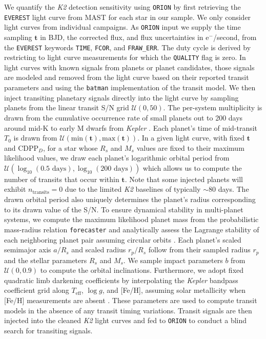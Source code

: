 \documentclass[twocolumn]{emulateapj}
\newcommand{\kepler}[1]{\emph{Kepler}#1}
\newcommand{\ktwo}[1]{\emph{K2}#1}
\newcommand{\teff}[1]{$T_{\text{eff}}$#1}
\newcommand{\logg}[1]{$\log{g}$#1}
\begin{document}
We quantify the \ktwo{} detection sensitivity using \texttt{ORION} by first retrieving the \texttt{EVEREST} light
curve from MAST for each star in our sample. We only consider light curves from individual campaigns. As
\texttt{ORION} input we supply the time sampling $\mathbf{t}$ in BJD, the corrected flux, and flux uncertainties
in e$^-$/second, from the \texttt{EVEREST} keywords \texttt{TIME}, \texttt{FCOR}, and \texttt{FRAW\_ERR}.
The duty cycle is derived by restricting to light curve measurements for which the \texttt{QUALITY} flag is zero.
In light curves with known signals from planets or planet candidates, those signals are modeled and removed from the
light curve based on their reported transit parameters and using the \texttt{batman} \citep{kreidberg15} implementation
of the \cite{mandel02} transit model. We then inject transiting planetary signals directly into the light curve
by sampling planets from the linear transit S/N grid $\mathcal{U}(0,50)$. The per-system
multiplicity is drawn
from the cumulative occurrence rate of small planets out to 200 days around
mid-K to early M dwarfs from \kepler{} \citep[$2.5 \pm 0.2$;][]{dressing15a}.
Each planet's time of mid-transit $T_0$ is
drawn from $\mathcal{U}(\text{min}(\mathbf{t}),\text{max}(\mathbf{t}))$.
In a given light curve, with fixed $\mathbf{t}$ and CDPP$_D$, for a star
whose $R_s$ and $M_s$ values are fixed to their maximum likelihood values, we
draw each planet's logarithmic orbital period from $\mathcal{U}(\log_{10}(0.5\text{ days}),\log_{10}(200\text{ days}))$
which allows us to compute the number of
transits that occur within $\mathbf{t}$. Note that some injected planets
will exhibit $n_{\text{transits}}=0$ due to the limited \ktwo{} baselines of typically $\sim 80$ days.
The drawn orbital period also uniquely determines the planet's radius corresponding to its drawn value of the S/N.
To ensure dynamical stability in multi-planet
systems, we compute the maximum likelihood planet mass from the probabilistic mass-radius relation \texttt{forecaster}
\citep{chen17} and analytically assess the Lagrange stability of each neighboring planet pair assuming circular
orbits \citep{barnes06}. Each planet's scaled semimajor axis $a/R_s$ and scaled radius $r_p/R_s$ follow from
their sampled radius $r_p$ and the stellar parameters $R_s$ and $M_s$. We sample impact parameters $b$ from
$\mathcal{U}(0,0.9)$ to compute the orbital inclinations. Furthermore, we adopt fixed quadratic limb darkening
coefficients by interpolating the \kepler{} bandpass coefficient grid along \teff{,} \logg{,} and [Fe/H], assuming
solar metallicity when [Fe/H] measurements are absent \citep{claret12}.
These parameters are used to compute transit models in the absence of any transit timing variations.
Transit signals are then injected into the cleaned \ktwo{} light curves and fed to
\texttt{ORION} to conduct a blind search for transiting signals.
\end{document}
